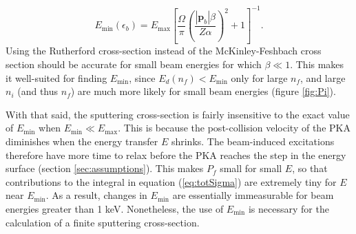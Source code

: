 \documentclass{article}
\begin{document}
\begin{equation}
  E_\text{min}(\epsilon_b)
  =
  E_\text{max}
  \left[\frac{\Omega}{\pi}
    \left(\frac{|\mathbf{p}_b|\beta}{Z\alpha}\right)^2 + 1
  \right]^{-1}.
  \label{eq:Emin}
\end{equation}
%
Using the Rutherford cross-section instead of the McKinley-Feshbach cross
section should be accurate for small beam energies for which $\beta\ll 1$.
This makes it well-suited for finding $E_\text{min}$, since
$E_d(n_f)<E_\text{min}$ only for large $n_f$, and large $n_i$ (and thus $n_f$)
are much more likely for small beam energies (figure \ref{fig:Pi}).

With that said, the sputtering cross-section is fairly insensitive to the exact
value of $E_\text{min}$ when $E_\text{min} \ll E_\text{max}$.
This is because the post-collision velocity of the PKA diminishes when the
energy transfer $E$ shrinks.
The beam-induced excitations therefore have more time to relax before the PKA
reaches the step in the energy surface (section \ref{sec:assumptions}).
This makes $P_f$ small for small $E$, so that contributions to the integral in
equation (\ref{eq:totSigma}) are extremely tiny for $E$ near $E_\text{min}$.
As a result, changes in $E_\text{min}$ are essentially immeasurable for beam
energies greater than 1 keV.
Nonetheless, the use of $E_\text{min}$ is necessary for the calculation of a
finite sputtering cross-section.




\end{document}
